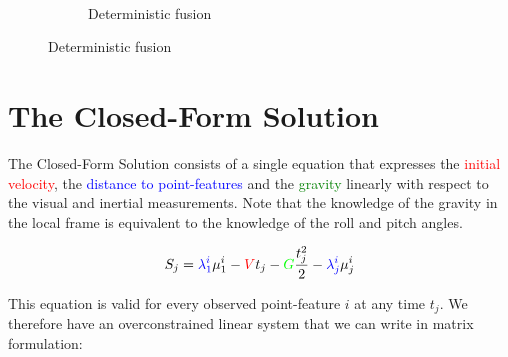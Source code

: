 \documentclass[final]{beamer}
\begin{document}
\begin{frame}[t]
\begin{multicols}{3}
\begin{figure}
\begin{subfigure}[t]{0.3\columnwidth}
  \end{subfigure}~
  \hspace*{6em}
  \begin{subfigure}[t]{0.3\columnwidth}
    \caption{Deterministic fusion}
    \hspace*{0.5em}

  \end{subfigure}
\end{figure}

\vspace{5.9cm}

\section{The Closed-Form Solution}

The Closed-Form Solution consists of a single equation that expresses the \textcolor{red}{initial velocity}, the \textcolor{blue}{distance to point-features} and the \textcolor{green}{gravity} linearly with respect to the visual and inertial measurements.
Note that the knowledge of the gravity in the local frame is equivalent to the knowledge of the roll and pitch angles.

\[
S_j = \textcolor{blue}{\lambda_1^i}\mu_1^i - \textcolor{red}{V} t_j - \textcolor{green}{G} \frac{t_j^2}{2} - \textcolor{blue}{\lambda^i_j} \mu^i_j
\]

\vspace{1cm}

This equation is valid for every observed point-feature $i$ at any time $t_j$.
We therefore have an overconstrained linear system that we can write in matrix formulation:


\end{multicols}
\end{frame}
\end{document}

